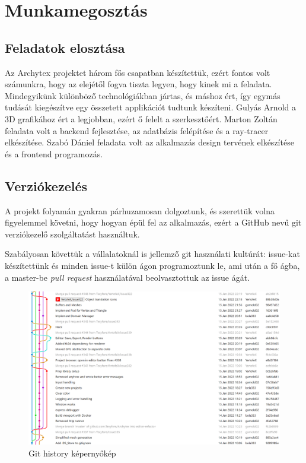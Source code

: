 \section{Munkamegosztás}

\subsection{Feladatok elosztása}
Az Archytex projektet három fős csapatban készítettük, ezért fontos volt számunkra, hogy az elejétől fogva tiszta legyen, hogy kinek mi a feladata. Mindegyikünk különböző technológiákban jártas, és máshoz ért, így egymás tudását kiegészítve egy összetett applikációt tudtunk készíteni. Gulyás Arnold a 3D grafikához ért a legjobban, ezért ő felelt a szerkesztőért. Marton Zoltán feladata volt a backend fejlesztése, az adatbázis felépítése és a ray-tracer elkészítése. Szabó Dániel feladata volt az alkalmazás design tervének elkészítése és a frontend programozás.

\subsection{Verziókezelés}
A projekt folyamán gyakran párhuzamosan dolgoztunk, és szerettük volna figyelemmel követni, hogy hogyan épül fel az alkalmazás, ezért a GitHub nevű git verziókezelő szolgáltatást használtuk.

Szabályosan követtük a vállalatoknál is jellemző git használati kultúrát: issue-kat készítettünk és minden issue-t külön ágon programoztunk le, ami után a fő ágba, a master-be \emph{pull request} használatával beolvasztottuk az issue ágát.

\begin{figure}[H]
  \centering
  \includegraphics[width=.9\textwidth]{parts/developer-documentation/work/images/git-history.png}
  \caption{Git history képernyőkép}
\end{figure}

